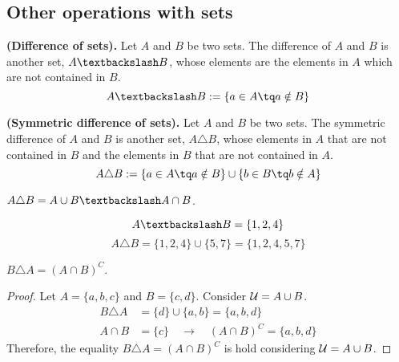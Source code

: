 \subsection{Other operations with sets}
\begin{definition}
    \textbf{(Difference of sets).} Let $A$ and $B$ be two sets. The difference of $A$ and $B$ is another set, $A\textbackslash B$, whose elements are the elements in $A$ which are not contained in $B$. 
    \begin{equation}
        A\textbackslash B := \{a\in A \tq a\notin B \} 
    \end{equation}
\end{definition}
\begin{definition}
    \textbf{(Symmetric difference of sets).} Let $A$ and $B$ be two sets. The symmetric difference of $A$ and $B$ is another set, $A\triangle B$, whose elements in $A$ that are not contained in $B$ and the elements in $B$ that are not contained in $A$.
    \begin{equation}
        A\triangle B := \{a\in A\tq a\notin B \}\cup \{b\in B\tq b\notin A \}  
    \end{equation}
\end{definition}
\begin{remark}
    $A\triangle B = A\cup B \textbackslash A\cap B$.
\end{remark}
\begin{example}[Let $A = \{1, 2, 3, 4\} $ and $B = \{3, 5, 7\} $.]
    \begin{equation}
        A\textbackslash B = \{1, 2, 4\} 
    \end{equation}
    \begin{equation}
        A\triangle B = \{1, 2, 4\}\cup \{5, 7\} = \{1, 2, 4, 5, 7\}   
    \end{equation}
\end{example}

\begin{proposition}
    $B\triangle A = \left( A\cap B \right)^C $.
\end{proposition}
\begin{proof}
    Let $A = \{a, b, c\} $ and $B = \{c, d\} $. Consider $\mathcal{U} = A\cup B$.
    \begin{align}
        B\triangle A &= \{d\}\cup \{a, b\} = \{a, b, d\} \\
        A\cap B &= \{c\} \quad\rightarrow\quad \left( A\cap B \right)^C = \{a, b, d\} 
    \end{align}
    Therefore, the equality $B\triangle A = \left( A\cap B \right)^C $ is hold considering $\mathcal{U} = A\cup B$.
\end{proof}

